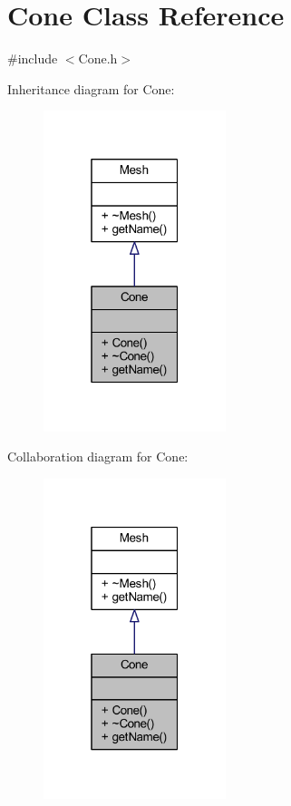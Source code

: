 \hypertarget{class_cone}{}\section{Cone Class Reference}
\label{class_cone}


{\ttfamily \#include $<$Cone.\+h$>$}



Inheritance diagram for Cone\+:
\nopagebreak
\begin{figure}[H]
\begin{center}
\leavevmode
\includegraphics[width=151pt]{class_cone__inherit__graph}
\end{center}
\end{figure}


Collaboration diagram for Cone\+:
\nopagebreak
\begin{figure}[H]
\begin{center}
\leavevmode
\includegraphics[width=151pt]{class_cone__coll__graph}
\end{center}
\end{figure}
